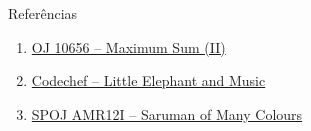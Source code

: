 \begin{frame}[fragile]{Referências}

    \begin{enumerate}
        \item \href{https://onlinejudge.org/index.php?option=com_onlinejudge&Itemid=8&category=24&page=show_problem&problem=1597}{OJ 10656 -- Maximum Sum (II)} 

        \item \href{https://www.codechef.com/problems/LEMUSIC}{Codechef -- Little Elephant and Music}

        \item \href{https://www.spoj.com/problems/AMR12I/}{SPOJ AMR12I -- Saruman of Many Colours}

    \end{enumerate}

\end{frame}
